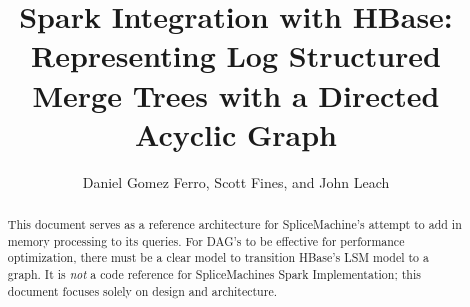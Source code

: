 \documentclass[10pt]{amsart}
\begin{document}
\title{Spark Integration with HBase: Representing Log Structured Merge Trees
with a Directed Acyclic Graph}
\author{Daniel Gomez Ferro, Scott Fines, and John Leach} 

\begin{abstract}
This document serves as a reference architecture for SpliceMachine's attempt to
add in memory processing to its queries.  For DAG's to be effective for
performance optimization, there must be a clear model to transition HBase's LSM
model to a graph. It is \emph{not} a code reference for SpliceMachines Spark
Implementation; this document focuses solely on design and architecture.
\end{abstract}

\maketitle


\end{document}

